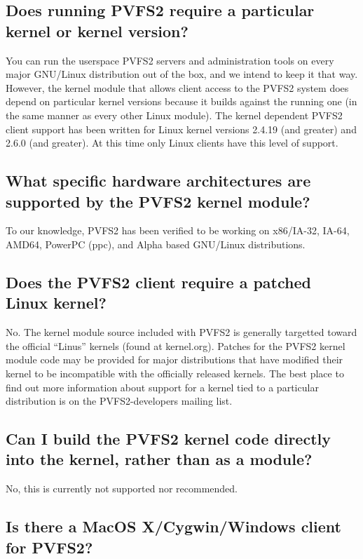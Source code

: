\documentclass[11pt,letterpaper]{article}
\begin{document}
\subsection{Does running PVFS2 require a particular kernel or kernel
            version?}
\label{sec:kernel-version}

You can run the userspace PVFS2 servers and administration tools on
every major GNU/Linux distribution out of the box, and we intend to
keep it that way.
%
However, the kernel module that allows client access to the PVFS2 system
does depend on particular kernel versions because it builds against
the running one (in the same manner as every other Linux module).
The kernel dependent PVFS2 client support has been written for Linux
kernel versions 2.4.19 (and greater) and 2.6.0 (and greater).  At this
time only Linux clients have this level of support.

\subsection{What specific hardware architectures are supported by the
            PVFS2 kernel module?}
\label{sec:supported-hw}

To our knowledge, PVFS2 has been verified to be working on x86/IA-32,
IA-64, AMD64, PowerPC (ppc), and Alpha based GNU/Linux distributions.

\subsection{Does the PVFS2 client require a patched Linux kernel?}

No.  The kernel module source included with PVFS2 is generally
targetted toward the official ``Linus'' kernels (found at kernel.org).
Patches for the PVFS2 kernel module code may be provided for major
distributions that have modified their kernel to be incompatible with
the officially released kernels.  The best place to find out more
information about support for a kernel tied to a particular
distribution is on the PVFS2-developers mailing list.

\subsection{Can I build the PVFS2 kernel code directly into the kernel,
            rather than as a module?}

No, this is currently not supported nor recommended.

\subsection{Is there a MacOS X/Cygwin/Windows client for PVFS2?}
\end{document}
